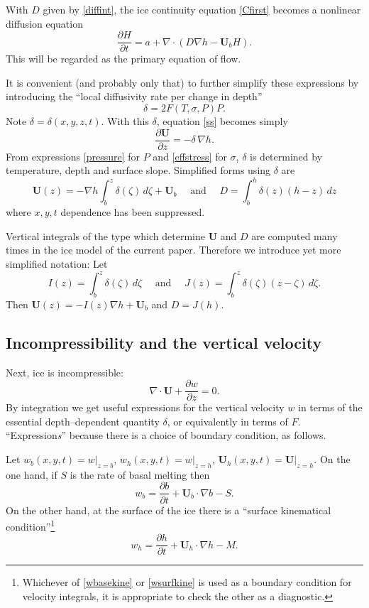 \documentclass[12pt,final]{amsart}%
\theoremstyle{plain}
\theoremstyle{definition}
\theoremstyle{remark}
\newcommand{\ddt}[1]{\ensuremath{\frac{\partial #1}{\partial t}}}
\newcommand{\ddz}[1]{\ensuremath{\frac{\partial #1}{\partial z}}}
\newcommand{\diverg}{\nabla\cdot}
\newcommand{\grad}{\nabla}
\newcommand{\bU}{{\mathbf{U}}}
\begin{document}
With $D$ given by \eqref{diffint}, the ice continuity equation \eqref{Cfirst} becomes a nonlinear diffusion equation
\begin{equation}\label{Cdiffform}
\ddt{H} = a + \diverg \left(D \grad h -\bU_b H\right).
\end{equation}
This will be regarded as the primary equation of flow.

It is convenient (and probably only that) to further simplify these expressions by introducing the ``local diffusivity rate per change in depth''
    $$\delta = 2 F(T,\sigma,P) P.$$
Note $\delta=\delta(x,y,z,t)$.  With this $\delta$, equation \eqref{ss} becomes simply
    $$\ddz{\bU} = - \delta \, \grad h.$$
From expressions \eqref{pressure} for $P$ and \eqref{effstress} for $\sigma$, $\delta$ is determined by temperature, depth and surface slope.  Simplified forms using $\delta$ are
\begin{equation}\label{UDsimp}
  \bU(z) = - \grad h \int_{b}^z \delta(\zeta) \,d\zeta + \bU_b \quad \text{ and } \quad D = \int_{b}^h \delta(z) (h-z) \,dz
\end{equation}
where $x,y,t$ dependence has been suppressed.

Vertical integrals of the type which determine $\bU$ and $D$ are computed many times in the ice model of the current paper.  Therefore we introduce yet more simplified notation:  Let
    $$I(z)=\int_b^z \delta(\zeta)\,d\zeta \quad \text{ and } \quad J(z)=\int_b^z \delta(\zeta)(z-\zeta)\,d\zeta.$$
Then $\bU(z)=-I(z)\grad h + \bU_b$ and $D=J(h)$.


\subsection*{Incompressibility and the vertical velocity}\label{incompsubsect}  Next, ice is incompressible:
\begin{equation}\label{incomp}
\diverg \bU + \ddz{w}=0.
\end{equation}
By integration we get useful expressions for the vertical velocity $w$ in terms of the essential depth--dependent quantity $\delta$, or equivalently in terms of $F$.  ``Expression\emph{s}'' because there is a choice of boundary condition, as follows.

Let $w_b(x,y,t)=w\big|_{z=b}$, $w_h(x,y,t)=w\big|_{z=h}$, $\bU_h(x,y,t)=\bU\big|_{z=h}$.  On the one hand, if $S$ is the rate of basal melting then \citep{PayneDongelmans}
\begin{equation}\label{wbasekine}
w_b=\ddt{b}+ \bU_b\cdot\grad b - S.
\end{equation}
On the other hand, at the surface of the ice there is a ``surface kinematical condition''\footnote{Whichever of \eqref{wbasekine} or \eqref{wsurfkine} is used as a boundary condition for velocity integrals, it is appropriate to check the other as a diagnostic.}
\begin{equation}\label{wsurfkine}
w_h=\ddt{h}+ \bU_h\cdot\grad h - M.
\end{equation}
\end{document}
